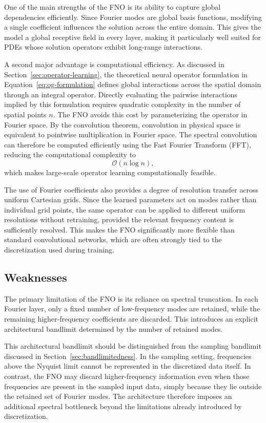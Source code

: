 One of the main strengths of the FNO is its ability to capture global dependencies efficiently. Since Fourier modes are global basis functions, modifying a single coefficient influences the solution across the entire domain. This gives the model a global receptive field in every layer, making it particularly well suited for PDEs whose solution operators exhibit long-range interactions.

A second major advantage is computational efficiency. As discussed in Section~\ref{sec:operator-learning}, the theoretical neural operator formulation in Equation~\ref{eq:og-formulation} defines global interactions across the spatial domain through an integral operator. Directly evaluating the pairwise interactions implied by this formulation requires quadratic complexity in the number of spatial points $n$. The FNO avoids this cost by parameterizing the operator in Fourier space. By the convolution theorem, convolution in physical space is equivalent to pointwise multiplication in Fourier space. The spectral convolution can therefore be computed efficiently using the Fast Fourier Transform (FFT), reducing the computational complexity to
\begin{equation}
\mathcal{O}(n \log n),
\end{equation}
which makes large-scale operator learning computationally feasible.

The use of Fourier coefficients also provides a degree of resolution transfer across uniform Cartesian grids. Since the learned parameters act on modes rather than individual grid points, the same operator can be applied to different uniform resolutions without retraining, provided the relevant frequency content is sufficiently resolved. This makes the FNO significantly more flexible than standard convolutional networks, which are often strongly tied to the discretization used during training.

\subsection{Weaknesses}

The primary limitation of the FNO is its reliance on spectral truncation. In each Fourier layer, only a fixed number of low-frequency modes are retained, while the remaining higher\hyp{}frequency coefficients are discarded. This introduces an explicit architectural bandlimit determined by the number of retained modes.

This architectural bandlimit should be distinguished from the sampling bandlimit discussed in Section~\ref{sec:bandlimitedness}. In the sampling setting, frequencies above the Nyquist limit cannot be represented in the discretized data itself. In contrast, the FNO may discard higher\hyp{}frequency information even when those frequencies are present in the sampled input data, simply because they lie outside the retained set of Fourier modes. The architecture therefore imposes an additional spectral bottleneck beyond the limitations already introduced by discretization.

